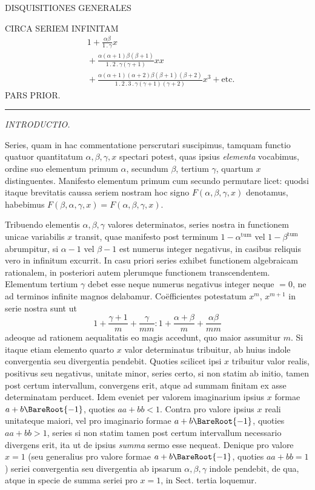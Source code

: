\clearpage{}
\begin{center}
DISQUISITIONES GENERALES

\medskip
CIRCA SERIEM INFINITAM
\[
\begin{aligned}&1+\frac{\alpha\beta}{1\mathbin{.}\gamma}x\\
&{}+\frac{\alpha(\alpha+1)\beta(\beta+1)}{1\mathbin{.}2\mathbin{.}\gamma(\gamma+1)}xx\\
&{}+\frac{\alpha(\alpha+1)(\alpha+2)\beta(\beta+1)(\beta+2)}{1\mathbin{.}2\mathbin{.}3\mathbin{.}\gamma(\gamma+1)(\gamma+2)}x^3+\mathrm{etc.}
\end{aligned}
\]
PARS PRIOR.

\medskip
\rule{0.13\linewidth}{0.4pt}

\medskip
\textit{INTRODUCTIO.}

\end{center}
Series, quam in hac commentatione perscrutari suscipimus, tamquam functio
quatuor quantitatum $\alpha,\beta,\gamma,x$ spectari potest, quas ipsius \textit{elementa} vocabimus,
ordine suo elementum primum $\alpha$, secundum $\beta$, tertium $\gamma$, quartum $x$ distinguentes. Manifesto elementum primum cum secundo permutare licet: quodsi itaque brevitatis caussa seriem nostram hoc signo $F(\alpha,\beta,\gamma,x)$ denotamus, habebimus $F(\beta,\alpha,\gamma,x)=F(\alpha,\beta,\gamma,x)$.

Tribuendo elementis $\alpha,\beta,\gamma$ valores determinatos, series nostra in functionem unicae variabilis $x$ transit, quae manifesto post terminum $1-\alpha^{\mathrm{tum}}$ vel
$1-\beta^{\mathrm{tum}}$ abrumpitur, si $\alpha-1$ vel $\beta-1$ est numerus integer negativus, in casibus reliquis vero in infinitum excurrit. In casu priori series exhibet functionem
algebraicam rationalem, in posteriori autem plerumque functionem transcendentem. Elementum tertium $\gamma$ debet esse neque numerus negativus integer neque
$=0$, ne ad terminos infinite magnos delabamur.
Co\"efficientes potestatum $x^m$, $x^{m+1}$ in serie nostra sunt ut
\[
1+\frac{\gamma+1}{m}+\frac{\gamma}{mm}:1+\frac{\alpha+\beta}{m}+\frac{\alpha\beta}{mm}
\]
adeoque ad rationem aequalitatis eo magis accedunt, quo maior assumitur $m$. Si
itaque etiam elemento quarto $x$ valor determinatus tribuitur, ab huius indole
convergentia seu divergentia pendebit. Quoties scilicet ipsi $x$ tribuitur valor realis, positivus seu negativus, unitate minor, series certo, si non statim ab initio,
tamen post certum intervallum, convergens erit, atque ad summam finitam ex
asse determinatam perducet. Idem eveniet per valorem imaginarium ipsius $x$
formae $a+b\BareRoot{-1}$, quoties $aa+bb<1$. Contra pro valore ipsius $x$ reali unitateque maiori, vel pro imaginario formae $a+b\BareRoot{-1}$, quoties $aa+bb>1$, series si non statim tamen post certum intervallum necessario divergens erit, ita ut
de ipsius \textit{summa} sermo esse nequeat. Denique pro valore $x=1$ (seu generalius
pro valore formae $a+b\BareRoot{-1}$, quoties $aa+bb=1$) seriei convergentia seu divergentia ab ipsarum $\alpha,\beta,\gamma$ indole pendebit, de qua, atque in specie de summa
seriei pro $x=1$, in Sect. tertia loquemur.

